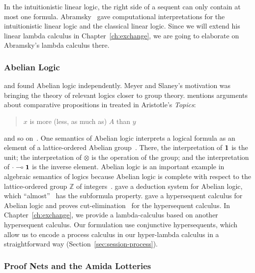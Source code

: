 
 In the intuitionistic linear logic, the right side of a sequent can only
 contain at most one formula.
 Abramsky~\citep{abramsky1993computational} gave computational
 interpretations for the intuitionistic linear logic and the classical
 linear logic.  Since we will extend his linear lambda calculus in
 Chapter~\ref{ch:exchange}, we are going to elaborate on Abramsky's
 lambda calculus there.

 \subsubsection{Abelian Logic}

 \citet{meyer-slaney-1989} and \citet{casari1989} found Abelian logic
 independently.  Meyer and Slaney's motivation was bringing the
 theory of relevant logics closer to group theory.
 \citet{casari1989} mentions arguments about comparative propositions in
 treated in Aristotle's \textit{Topics}:
  \begin{quote}
   $x$ is more (less, as much as) $A$ than $y$
  \end{quote}
 and so on~\citep[p.~161]{casari1989}.
 One semantics of Abelian logic interprets a logical formula as an
 element of a lattice-ordered Abelian group~\citep[3.4.2.]{residuated}.  There,
 the interpretation of $\mathbf{1}$ is the unit;
 the interpretation of $\otimes$ is the operation of the group; and
 the interpretation of $\cdot\multimap\mathbf{1}$ is the inverse element.
 Abelian logic is an important example in algebraic semantics of logics
 because Abelian logic is complete with respect to the lattice-ordered
 group $\mathbb Z$ of integers~\citep[pp.~107-108]{residuated}.
 \citet{metcalfe2002} gave a deduction system for Abelian logic,
 which ``almost''~\citep[after Definition~8]{metcalfe2002} has the subformula property.
 \citet{metcalfe2006} gave a hypersequent calculus for Abelian logic and
 proves cut-elimination~\citep[Theorem~5]{metcalfe2006} for the
 hypersequent calculus.
 In Chapter~\ref{ch:exchange}, we provide a lambda-calculus based on
 another hypersequent calculus.  Our formulation use conjunctive
 hypersequents, which allow us to encode a process calculus in our
 hyper-lambda calculus in a straightforward way
 (Section~\ref{sec:session-process}).

 \subsubsection{Proof Nets and the Amida Lotteries}
 \label{amidalot}

